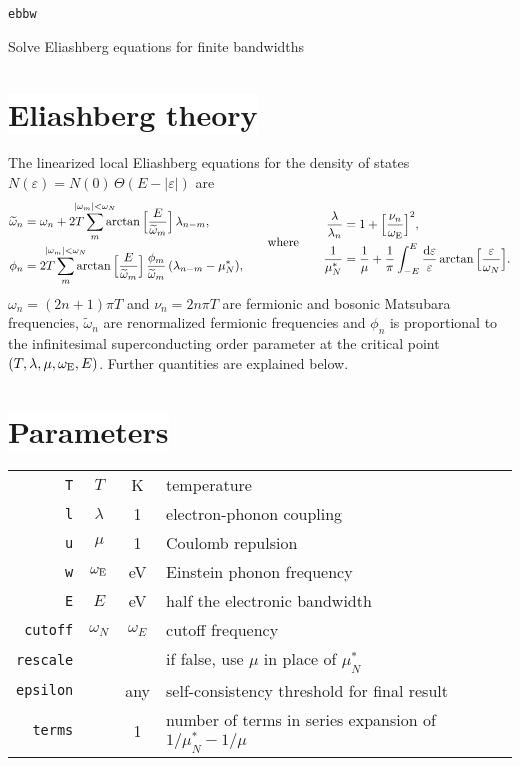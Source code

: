 \documentclass[a4paper]{article}
\def\D{\mathrm d}
\def\sub#1{\sb{\mathrm{#1}}}
\def\limit#1{\sp{\mathclap{#1}}}
\let\tilde\widetilde
\let\epsilon\varepsilon
\let\Theta\varTheta
\def\headline#1{\section*{\normalsize\normalfont%
   \rlap{\rule[0.5ex]{\textwidth}{0.4pt}}\qquad\colorbox{white}{#1}}}
\begin{document}
   \begin{center}
      \LARGE \texttt{ebbw} \par \bigskip
      \large Solve Eliashberg equations for finite bandwidths
   \end{center}

   \headline{Eliashberg theory}

   The linearized local Eliashberg equations for the density of states
   $N(\epsilon) = N(0) \, \Theta(E - |\epsilon|)$ are
   \begin{align*}
      \begin{aligned}
         \tilde \omega_n &= \omega_n + 2 T \sum_m \limit{|\omega_m| < \omega_N}
         \arctan \Big[ \frac E {\tilde \omega_m} \Big] \, \lambda_{n - m},
         \\
         \phi_n &= 2 T \sum_m \limit{|\omega_m| < \omega_N}
         \arctan \Big[ \frac E {\tilde \omega_m} \Big] \,
         \frac{\phi_m}{\tilde \omega_m} \, (\lambda_{n - m} - \mu^*_N),
      \end{aligned}
      \qquad \text{where} \qquad
      \begin{aligned}
         \frac \lambda {\lambda_n} &=
         1 + \Big[ \frac{\nu_n}{\omega \sub E} \Big]^2,
         \\
         \frac 1 {\mu^*_N} &=
         \frac 1 \mu + \frac 1 \pi \int_{-E}^E \frac {\D \epsilon} \epsilon
         \arctan \Big[ \frac \epsilon {\omega_N} \Big].
      \end{aligned}
   \end{align*}
   $\omega_n = (2 n + 1) \pi T$ and $\nu_n = 2 n \pi T$ are fermionic and
   bosonic Matsubara frequencies, $\tilde \omega_n$ are renormalized fermionic
   frequencies and $\phi_n$ is proportional to the infinitesimal superconducting
   order parameter at the critical point $(T, \lambda, \mu, \omega \sub E, E)$.
   Further quantities are explained below.

   \headline{Parameters}

   \begin{center}
      \begin{tabular}{r c c l}
         \verb|T| & $T$ & K & temperature \\
         \verb|l| & $\lambda$ & 1 & electron-phonon coupling \\
         \verb|u| & $\mu$ & 1 & Coulomb repulsion \\
         \verb|w| & $\omega \sub E$ & eV & Einstein phonon frequency \\
         \verb|E| & $E$ & eV & half the electronic bandwidth \\
         [2mm]
         \verb|cutoff| & $\omega_N$ & $\omega_E$ & cutoff frequency \\
         \verb|rescale| & & & if false, use $\mu$ in place of $\mu^*_N$ \\
         \verb|epsilon| & & any & self-consistency threshold for final result \\
         \verb|terms| & & 1 & number of terms in series expansion of
         $1 / \mu^*_N - 1 / \mu$
      \end{tabular}
   \end{center}
\end{document}
